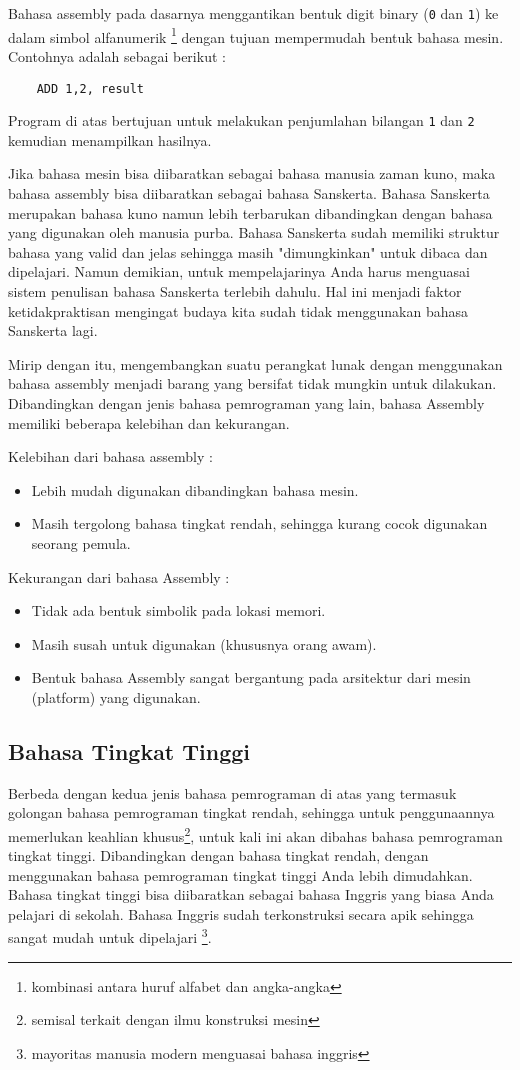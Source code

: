 Bahasa assembly pada dasarnya menggantikan bentuk digit binary (\texttt{0} dan \texttt{1}) ke dalam simbol alfanumerik \footnote{kombinasi antara huruf alfabet dan angka-angka} dengan tujuan mempermudah bentuk bahasa mesin. Contohnya adalah sebagai berikut :
\begin{verbatim}
    ADD 1,2, result
\end{verbatim}
Program di atas bertujuan untuk melakukan penjumlahan bilangan \texttt{1} dan \texttt{2} kemudian menampilkan hasilnya.

Jika bahasa mesin bisa diibaratkan sebagai bahasa manusia zaman kuno, maka bahasa assembly bisa diibaratkan sebagai bahasa Sanskerta. Bahasa Sanskerta merupakan bahasa kuno namun lebih terbarukan dibandingkan dengan bahasa yang digunakan oleh manusia purba.  Bahasa Sanskerta sudah memiliki struktur bahasa yang valid dan jelas sehingga masih "dimungkinkan" untuk dibaca dan dipelajari. Namun demikian, untuk mempelajarinya Anda harus menguasai sistem penulisan bahasa Sanskerta terlebih dahulu. Hal ini menjadi faktor ketidakpraktisan mengingat budaya kita sudah tidak menggunakan bahasa Sanskerta lagi. 

Mirip dengan itu, mengembangkan suatu perangkat lunak dengan menggunakan bahasa assembly menjadi barang yang bersifat tidak mungkin untuk dilakukan. Dibandingkan dengan jenis bahasa pemrograman yang lain, bahasa Assembly memiliki beberapa kelebihan dan kekurangan.

Kelebihan dari bahasa assembly :
\begin{itemize}
	\item Lebih mudah digunakan dibandingkan bahasa mesin.
	\item Masih tergolong bahasa tingkat rendah, sehingga kurang cocok digunakan seorang pemula.
\end{itemize}

Kekurangan dari bahasa Assembly :
\begin{itemize}
	\item Tidak ada bentuk simbolik pada lokasi memori.
	\item Masih susah untuk digunakan (khususnya orang awam).
	\item Bentuk bahasa Assembly sangat bergantung pada arsitektur dari mesin (platform) yang digunakan. 
\end{itemize}

\subsection{Bahasa Tingkat Tinggi}
Berbeda dengan kedua jenis bahasa pemrograman di atas yang termasuk golongan bahasa pemrograman tingkat rendah, sehingga untuk penggunaannya memerlukan keahlian khusus\footnote{semisal terkait dengan ilmu konstruksi mesin}, untuk kali ini akan dibahas bahasa pemrograman tingkat tinggi. Dibandingkan dengan bahasa tingkat rendah, dengan menggunakan bahasa pemrograman tingkat tinggi Anda lebih dimudahkan. Bahasa tingkat tinggi bisa diibaratkan sebagai bahasa Inggris yang biasa Anda pelajari di sekolah. Bahasa Inggris sudah terkonstruksi secara apik sehingga sangat mudah untuk dipelajari \footnote{mayoritas manusia modern menguasai bahasa inggris}.

